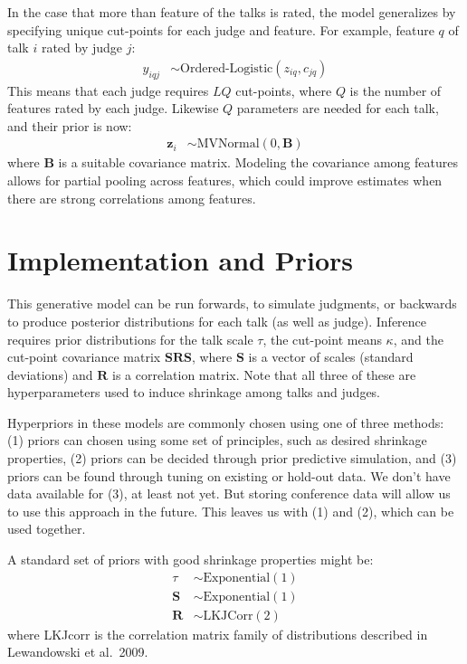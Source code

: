 \documentclass[reqno ,11pt]{amsart}
\begin{document}
In the case that more than feature of the talks is rated, the model generalizes by specifying unique cut-points for each judge and feature. For example, feature $q$ of talk $i$ rated by judge $j$:
\begin{align*}
  y_{iqj} &\sim \text{Ordered-Logistic}(z_{iq},c_{jq})
\end{align*}
This means that each judge requires $LQ$ cut-points, where $Q$ is the number of features rated by each judge. Likewise $Q$ parameters are needed for each talk, and their prior is now:
\begin{align*}
  \mathbf{z}_i &\sim \text{MVNormal}( 0 , \mathbf{B} )
\end{align*}
where $\mathbf B$ is a suitable covariance matrix. Modeling the covariance among features allows for partial pooling across features, which could improve estimates when there are strong correlations among features.

\section{Implementation and Priors}

This generative model can be run forwards, to simulate judgments, or backwards to produce posterior distributions for each talk (as well as judge). Inference requires prior distributions for the talk scale $\tau$, the cut-point means $\kappa$, and the cut-point covariance matrix $\mathbf{SRS}$, where $\mathbf{S}$ is a vector of scales (standard deviations) and $\mathbf{R}$ is a correlation matrix. Note that all three of these are hyperparameters used to induce shrinkage among talks and judges.

Hyperpriors in these models are commonly chosen using one of three methods: (1) priors can chosen using some set of principles, such as desired shrinkage properties, (2) priors can be decided through prior predictive simulation, and (3) priors can be found through tuning on existing or hold-out data. We don't have data available for (3), at least not yet. But storing conference data will allow us to use this approach in the future. This leaves us with (1) and (2), which can be used together. 

A standard set of priors with good shrinkage properties might be:
\begin{align*}
  \tau &\sim \text{Exponential}(1)\\
  \mathbf{S} &\sim \text{Exponential}(1)\\
  \mathbf{R} &\sim \text{LKJCorr}(2)
\end{align*}
where LKJcorr is the correlation matrix family of distributions described in Lewandowski et al.~2009. %
\end{document}
